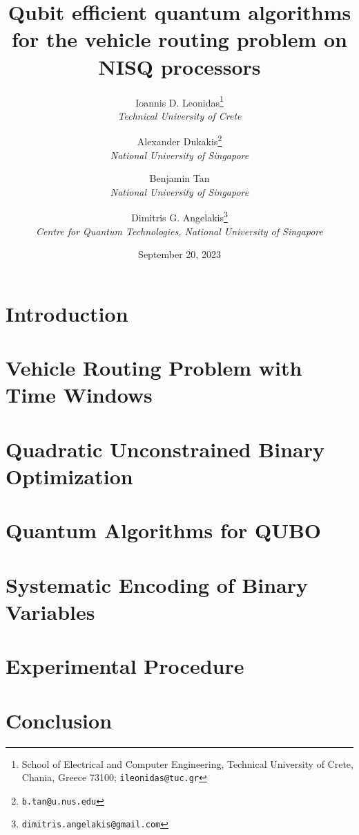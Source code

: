 \documentclass[12pt]{article}
\title{Qubit efficient quantum algorithms for the vehicle routing problem on NISQ processors}
\author{
    Ioannis D. Leonidas\thanks{School of Electrical and Computer Engineering, Technical University of Crete, Chania, Greece 73100; \texttt{ileonidas@tuc.gr}} \\
    \textit{Technical University of Crete} \and
    Alexander Dukakis\thanks{\texttt{b.tan@u.nus.edu}} \\
    \textit{National University of Singapore} \and
    Benjamin Tan \\
    \textit{National University of Singapore} \and
    Dimitris G. Angelakis\thanks{\texttt{dimitris.angelakis@gmail.com}} \\
    \textit{Centre for Quantum Technologies, National University of Singapore}
}
\date{September 20, 2023}
\begin{document}
\maketitle

\begin{abstract}
\end{abstract}

\section{Introduction}

\section{Vehicle Routing Problem with Time Windows}

\section{Quadratic Unconstrained Binary Optimization}

\section{Quantum Algorithms for QUBO}

\section{Systematic Encoding of Binary Variables}

\section{Experimental Procedure}

\section{Conclusion}

  
\end{document}
